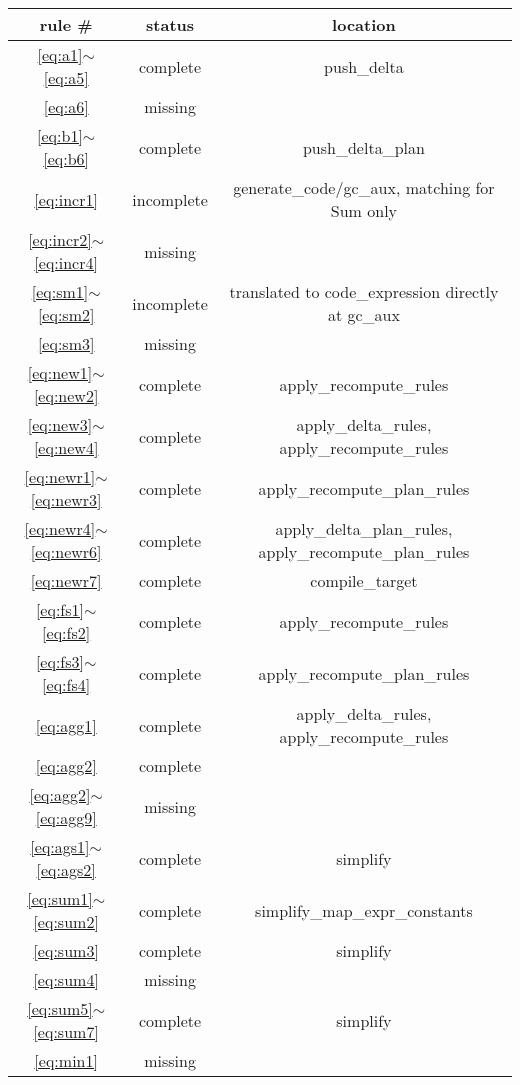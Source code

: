 \documentclass{article}
\begin{document}
\begin{tabular} {|c|c|c|}
\hline rule \# & status & location  \\
\hline \ref{eq:a1}$\sim$\ref{eq:a5} & complete & push\_delta \\
\hline \ref{eq:a6} & missing & \\
\hline \ref{eq:b1}$\sim$\ref{eq:b6} & complete & push\_delta\_plan\\
\hline \ref{eq:incr1} & incomplete & generate\_code/gc\_aux, matching for Sum only\\
\hline \ref{eq:incr2}$\sim$\ref{eq:incr4} & missing & \\
\hline \ref{eq:sm1}$\sim$\ref{eq:sm2} & incomplete & translated to code\_expression directly at gc\_aux\\
\hline \ref{eq:sm3} & missing & \\
\hline \ref{eq:new1}$\sim$\ref{eq:new2} & complete & apply\_recompute\_rules\\
\hline \ref{eq:new3}$\sim$\ref{eq:new4} & complete & apply\_delta\_rules, apply\_recompute\_rules\\
\hline \ref{eq:newr1}$\sim$\ref{eq:newr3} & complete & apply\_recompute\_plan\_rules\\
\hline \ref{eq:newr4}$\sim$\ref{eq:newr6} & complete & apply\_delta\_plan\_rules, apply\_recompute\_plan\_rules\\
\hline \ref{eq:newr7} & complete & compile\_target\\
\hline \ref{eq:fs1}$\sim$\ref{eq:fs2} & complete & apply\_recompute\_rules\\
\hline \ref{eq:fs3}$\sim$\ref{eq:fs4} & complete & apply\_recompute\_plan\_rules\\
\hline \ref{eq:agg1} & complete & apply\_delta\_rules, apply\_recompute\_rules\\
\hline \ref{eq:agg2} & complete & \\
\hline \ref{eq:agg2}$\sim$\ref{eq:agg9} & missing & \\
\hline \ref{eq:ags1}$\sim$\ref{eq:ags2} & complete & simplify \\
\hline \ref{eq:sum1}$\sim$\ref{eq:sum2} & complete & simplify\_map\_expr\_constants \\
\hline \ref{eq:sum3} & complete & simplify \\
\hline \ref{eq:sum4} & missing & \\
\hline \ref{eq:sum5}$\sim$\ref{eq:sum7} & complete & simplify \\
\hline \ref{eq:min1} & missing & \\

\end{tabular}
\end{document}
